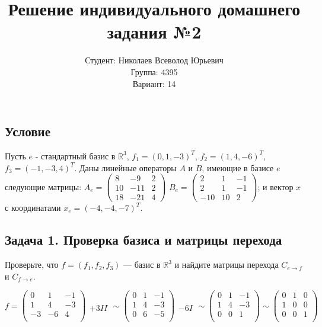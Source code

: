 \documentclass[12pt]{article}
\title{Решение индивидуального домашнего задания №2}
\author{Студент: Николаев Всеволод Юрьевич \\ 
Группа: 4395\\
Вариант: 14
}
\date{}
\begin{document}
\maketitle

\subsection*{Условие}
Пусть $e$ - стандартный базис в $\mathbb{R}^3$, $f_1 = (0, 1, -3)^T$, $f_2 = (1, 4, -6)^T$, $f_3 = (-1, -3, 4)^T$. Даны линейные операторы $A$ и $B$, имеющие в базисе $e$ следующие матрицы: $A_e = \begin{pmatrix} 8 & -9 & 2 \\ 10 & -11 & 2 \\ 18 & -21 & 4 \end{pmatrix}$ $B_e = \begin{pmatrix} 2 & 1 & -1 \\ 2 & 1 & -1 \\ -10 & 10 & 2 \end{pmatrix}$; и вектор $x$ с координатами $x_e = (-4, -4, -7)^T$.

\subsection*{Задача 1. Проверка базиса и матрицы перехода}
Проверьте, что $ f = (f_1, f_2, f_3) $ — базис в $ \mathbb{R}^3 $ и найдите матрицы перехода $ C_{e \rightarrow f} $ и $ C_{f \rightarrow e} $.

$$
	f =
	\begin{pmatrix}
		0  & 1  & -1 \\
		1  & 4  & -3 \\
		-3 & -6 & 4  \\
	\end{pmatrix}
	\begin{matrix} \\  \\ +3II \\ \end{matrix} \sim
	\begin{pmatrix}
		0 & 1 & -1 \\
		1 & 4 & -3 \\
		0 & 6 & -5 \\
	\end{pmatrix}
	\begin{matrix} \\  \\ -6I \\ \end{matrix} \sim
	\begin{pmatrix}
		0 & 1 & -1 \\
		1 & 4 & -3 \\
		0 & 0 & 1  \\
	\end{pmatrix} \sim
	\begin{pmatrix}
		0 & 1 & 0 \\
		1 & 0 & 0 \\
		0 & 0 & 1 \\
	\end{pmatrix}
$$
\end{document}
